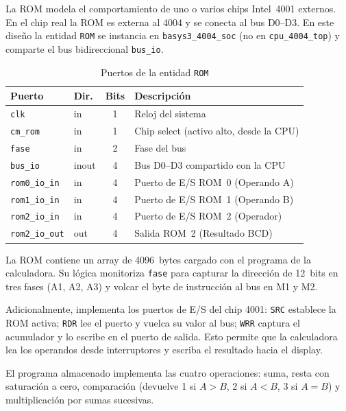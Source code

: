 \documentclass[%
    school=etsisi,%
    type=pfg,%
    degree=61CI,%
]{upm-report}
\begin{document}
La ROM modela el comportamiento de uno o varios chips Intel~4001 externos.
En el chip real la ROM es externa al 4004 y se conecta al bus D0--D3.  En
este diseño la entidad \texttt{ROM} se instancia en \texttt{basys3\_4004\_soc}
(no en \texttt{cpu\_4004\_top}) y comparte el bus bidireccional \texttt{bus\_io}.

\begin{table}[H]
\centering
\caption{Puertos de la entidad \texttt{ROM}}
\label{tab:rom}
\begin{tabularx}{\textwidth}{@{}llcX@{}}
\toprule
\textbf{Puerto}      & \textbf{Dir.} & \textbf{Bits} & \textbf{Descripción} \\
\midrule
\texttt{clk}          & in    & 1  & Reloj del sistema \\
\texttt{cm\_rom}      & in    & 1  & Chip select (activo alto, desde la CPU) \\
\texttt{fase}         & in    & 2  & Fase del bus \\
\texttt{bus\_io}      & inout & 4  & Bus D0--D3 compartido con la CPU \\
\texttt{rom0\_io\_in} & in    & 4  & Puerto de E/S ROM~0 (Operando A) \\
\texttt{rom1\_io\_in} & in    & 4  & Puerto de E/S ROM~1 (Operando B) \\
\texttt{rom2\_io\_in} & in    & 4  & Puerto de E/S ROM~2 (Operador) \\
\texttt{rom2\_io\_out}& out   & 4  & Salida ROM~2 (Resultado BCD) \\
\bottomrule
\end{tabularx}
\end{table}

La ROM contiene un array de 4096~bytes cargado con el programa de la
calculadora.  Su lógica monitoriza \texttt{fase} para capturar la dirección
de 12~bits en tres fases (A1, A2, A3) y volcar el byte de instrucción al bus
en M1 y M2.

Adicionalmente, implementa los puertos de E/S del chip 4001: \texttt{SRC}
establece la ROM activa; \texttt{RDR} lee el puerto y vuelca su valor al bus;
\texttt{WRR} captura el acumulador y lo escribe en el puerto de salida.  Esto
permite que la calculadora lea los operandos desde interruptores y escriba el
resultado hacia el display.

El programa almacenado implementa las cuatro operaciones: suma, resta con
saturación a cero, comparación (devuelve 1 si $A>B$, 2 si $A<B$, 3 si $A=B$)
y multiplicación por sumas sucesivas.
\end{document}
